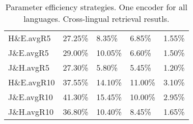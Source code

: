 \begin{table}
\begin{tabular}{l|l|lll}
    \midrule
    H\&E.avgR5   &                  27.25\% &                  8.35\% &                         6.85\% &                     1.55\% \\
    J\&E.avgR5   &                  29.00\% &                 10.05\% &                         6.60\% &                     1.50\% \\
    J\&H.avgR5   &                  27.30\% &                  5.80\% &                         5.45\% &                     1.20\% \\
    \midrule
    H\&E.avgR10  &                  37.55\% &                 14.10\% &                        11.00\% &                     3.10\% \\
    J\&E.avgR10  &                  41.30\% &                 15.45\% &                        10.00\% &                     2.95\% \\
    J\&H.avgR10  &                  36.80\% &                 10.40\% &                         8.45\% &                     1.65\% \\
    \bottomrule
    \end{tabular}

\caption{Parameter efficiency strategies. One encoder for all languages. Cross-lingual retrieval resutls.}
\label{table:param_eff}
\end{table}
